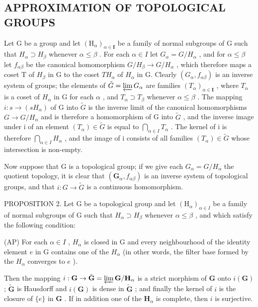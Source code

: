 \subsection{APPROXIMATION OF TOPOLOGICAL GROUPS}

Let G be a group and let \((\mathrm{H}_{\alpha})_{\alpha\in\mathbf{I}}\) be a family of normal subgroups of G such that \(H_{\alpha}\supset H_{\beta}\) whenever \(\alpha\leqslant\beta\) . For each \(\alpha\in I\) let \(G_{\alpha}=G/H_{\alpha}\) , and for \(\alpha\leqslant\beta\) let \(f_{\alpha\beta}\) be the canonical homomorphism \(G/H_{\beta}\to G/H_{\alpha}\) , which therefore maps a coset T of \(H_{\beta}\) in G to the coset \(TH_{\alpha}\) of \(H_{\alpha}\) in G. Clearly \((G_{\alpha},f_{\alpha\beta})\) is an inverse system of groups; the elements of \(\tilde{G}=\varprojlim G_{\alpha}\) are families \((T_{\alpha})_{\alpha\in\mathbf{I}}\) , where \(T_{\alpha}\) is a coset of \(H_{\alpha}\) in G for each \(\alpha\) , and \(T_{\alpha}\supset T_{\beta}\) whenever \(\alpha\leqslant\beta\) . The mapping \(i:s\to(sH_{\alpha})\) of G into \(\tilde{G}\) is the inverse limit of the canonical homomorphisms \(G\to G/H_{\alpha}\) and is therefore a homomorphism of G into \(\tilde{G}\) , and the inverse image under i of an element \((T_{\alpha})\in\tilde{G}\) is equal to \(\bigcap_{\alpha\in I}T_{\alpha}\) . The kernel of i is therefore \(\bigcap_{\alpha\in I}H_{\alpha}\) , and the image of i consists of all families \((T_{\alpha})\in\tilde{G}\) whose intersection is non-empty.

Now suppose that G is a topological group; if we give each \(G_{\alpha} = G/H_{\alpha}\) the quotient topology, it is clear that \((\mathbf{G}_{\alpha}, f_{\alpha\beta})\) is an inverse system of topological groups, and that \(i : G \to \tilde{G}\) is a continuous homomorphism.

PROPOSITION 2. Let G be a topological group and let \((\mathrm{H}_{\alpha})_{\alpha\in I}\) be a family of normal subgroups of G such that \(H_{\alpha}\supset H_{\beta}\) whenever \(\alpha\leqslant\beta\) , and which satisfy the following condition:

(AP) For each \(\alpha \in I\) , \(H_{\alpha}\) is closed in G and every neighbourhood of the identity element \(e\) in G contains one of the \(H_{\alpha}\) (in other words, the filter base formed by the \(H_{\alpha}\) converges to \(e\) ).

Then the mapping \(i: \mathbf{G} \to \tilde{\mathbf{G}} = \varprojlim \mathbf{G} / \mathbf{H}_{\alpha}\) is a strict morphism of \(\mathbf{G}\) onto \(i(\mathbf{G})\) ; \(\tilde{\mathbf{G}}\) is Hausdorff and \(i(\mathbf{G})\) is dense in \(\tilde{\mathbf{G}}\) ; and finally the kernel of \(i\) is the closure of \(\{e\}\) in \(\mathbf{G}\) . If in addition one of the \(\mathbf{H}_{\alpha}\) is complete, then \(i\) is surjective.

